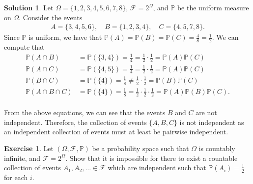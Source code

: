 \documentclass[12pt]{article}
\newcommand{\Prob}{\mathbb{P}}
\newcommand{\calF}{\mathcal{F}}
\theoremstyle{definition}
\newtheorem{exer}{Exercise}
\newtheorem{sol}{Solution}
\theoremstyle{remark}
\begin{document}
\begin{sol}
    Let $\Omega = \{1,2,3,4,5,6,7,8 \}$, $\calF = 2^\Omega$, and $\Prob$ be the uniform measure on $\Omega$. Consider the events
    \begin{align}
        A = \{3,4,5,6\}, \quad B = \{1,2,3,4 \}, \quad C=\{4,5,7,8\}.
    \end{align}
    Since $\Prob$ is uniform, we have that $\Prob(A) = \Prob(B) = \Prob(C) = \frac{4}{8}=\frac{1}{2}$. We can compute that
    \begin{align}
        \Prob(A\cap B) &= \Prob(\{3,4\}) = \frac{1}{4} = \frac{1}{2} \cdot \frac{1}{2} = \Prob(A)\Prob(C)\\
        \Prob(A\cap C) &= \Prob(\{4,5\}) = \frac{1}{4} = \frac{1}{2} \cdot \frac{1}{2} = \Prob(A)\Prob(C)\\
        \Prob(B\cap C) &= \Prob(\{4\}) = \frac{1}{8} \neq \frac{1}{2} \cdot\frac{1}{2} = \Prob(B)\Prob(C)\\
        \Prob(A\cap B\cap C) &= \Prob(\{4\}) = \frac{1}{8} = \frac{1}{2} \cdot \frac{1}{2} \cdot \frac{1}{2} = \Prob(A)\Prob(B)\Prob(C).\\
    \end{align}

    From the above equations, we can see that the events $B$ and $C$ are not independent. Therefore, the collection of events $\{A, B, C\}$ is not independent as an independent collection of events must at least be pairwise independent.
\end{sol}

\newpage

\begin{exer}
Let $(\Omega, \calF, \Prob)$ be a probability space such that $\Omega$ is countably infinite, and $\calF = 2^\Omega$. Show that it is impossible for there to exist a countable collection of events $A_1, A_2, \ldots \in \calF$ which are independent such that $\Prob(A_i) = \frac{1}{2}$ for each $i$.
\end{exer}
\end{document}
